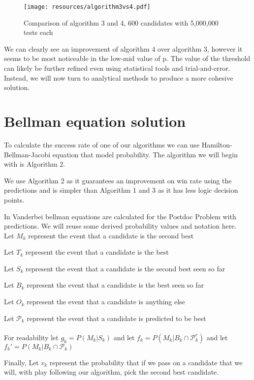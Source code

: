 \documentclass[a4paper,11pt]{article}
\begin{document}
\begin{figure}[H]
    \centering
    \texttt{[image: resources/algorithm3vs4.pdf]}
    \caption{Comparison of algorithm 3 and 4, 600 candidates with 5,000,000 tests each}
    \label{fig:placeholder}
\end{figure}

We can clearly see an improvement of algorithm 4 over algorithm 3, however it seems to be most noticeable in the low-mid value of p. The value of the threshold can likely be further refined even using statistical tools and trial-and-error. Instead, we will now turn to analytical methods to produce a more cohesive solution.

\section{Bellman equation solution}

To calculate the success rate of one of our algorithms we can use Hamilton-Bellman-Jacobi equation that model probability. The algorithm we will begin with is Algorithm 2. \cite{Dreyfus_2002}

We use Algorithm 2 as it guarantees an improvement on win rate using the predictions and is simpler than Algorithm 1 and 3 as it has less logic decision points.

In Vanderbei \cite{vanderbei2011postdoc} bellman equations are calculated for the Postdoc Problem with predictions. We will reuse some derived probability values and notation here.\\

Let $M_k$ represent the event that a candidate is the second best

Let $T_k$ represent the event that a candidate is the best

Let $S_k$ represent the event that a candidate is the second best seen so far

Let $B_k$ represent the event that a candidate is the best seen so far

Let $O_k$ represent the event that a candidate is anything else

Let $\mathcal{P}_k$ represent the event that a candidate is predicted to be best\\ \\
For readability let $g_k = P(M_k|S_k)$ and let $f_k = P(M_k| B_k\cap \mathcal{P}^c_k )$ and let $f_k' = P(M_k|B_k\cap \mathcal{P}_k )$ 

Finally, Let $v_k$ represent the probability that if we pass on a candidate that we will, with play following our algorithm, pick the second best candidate.
\end{document}
